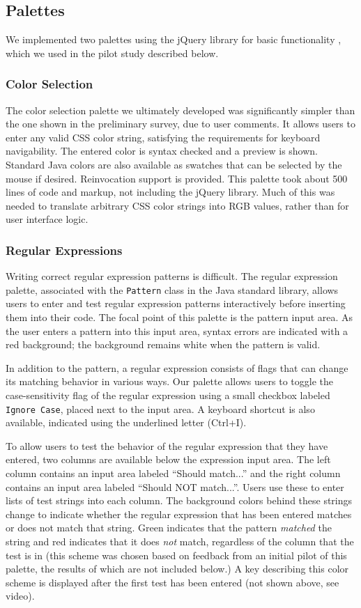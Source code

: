 \documentclass[10pt, conference, compsocconf]{IEEEtran}
\begin{document}
\subsection{Palettes}
We implemented two palettes using the jQuery library for basic functionality \cite{jQuery}, which we used in the pilot study described below.

\subsubsection{Color Selection}
The color selection palette we ultimately developed was significantly simpler than the one shown in the preliminary survey, due to user comments. It allows users to enter any valid CSS color string, satisfying the requirements for keyboard navigability. The entered color is syntax checked and a preview is shown. Standard Java colors are also available as swatches that can be selected by the mouse if desired. Reinvocation support is provided. This palette took about 500 lines of code and markup, not including the jQuery library. Much of this was needed to translate arbitrary CSS color strings into RGB values, rather than for user interface logic.

\subsubsection{Regular Expressions}
Writing correct regular expression patterns is difficult. The regular expression palette, associated with the \verb|Pattern| class in the Java standard library, allows users to enter and test regular expression patterns interactively before inserting them into their code.  The focal point of this palette is the pattern input area. As the user enters a pattern into this input area, syntax errors are indicated with a red background; the background remains white when the pattern is valid.

In addition to the pattern, a regular expression consists of flags that can change its matching behavior in various ways. Our palette allows users to toggle the case-sensitivity flag of the regular expression using a small checkbox labeled \verb|Ignore Case|, placed next to the input area. A keyboard shortcut is also available, indicated using the underlined letter (Ctrl+I). 

To allow users to test the behavior of the regular expression that they have entered, two columns are available below the expression input area. The left column contains an input area labeled ``Should match...'' and the right column contains an input area labeled ``Should NOT match...''. Users use these to enter lists of test  strings into each column. The background colors behind these strings change to indicate whether the regular expression that has been entered matches or does not match that string. Green indicates that the pattern  {\it matched} the string and red indicates that it does {\it not} match, regardless of the column that the test is in (this scheme was chosen based on feedback from an initial pilot of this palette, the results of which are not included below.) A key describing this color scheme is displayed after the first test has been entered (not shown above, see video).
\end{document}
